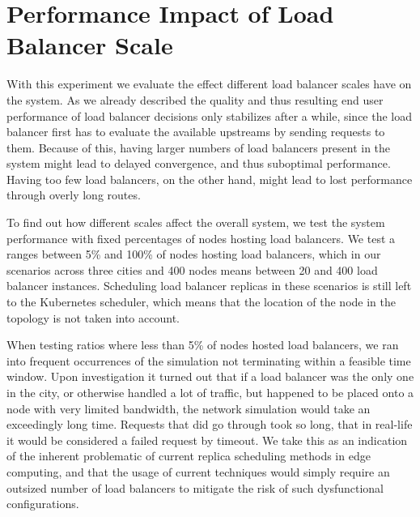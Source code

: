 \section{Performance Impact of Load Balancer Scale}
With this experiment we evaluate the effect different load balancer scales have on the system.
As we already described the quality and thus resulting end user performance of load balancer decisions only stabilizes after a while, since the load balancer first has to evaluate the available upstreams by sending requests to them.
Because of this, having larger numbers of load balancers present in the system might lead to delayed convergence, and thus suboptimal performance.
Having too few load balancers, on the other hand, might lead to lost performance through overly long routes.

To find out how different scales affect the overall system, we test the system performance with fixed percentages of nodes hosting load balancers.
We test a ranges between 5\% and 100\% of nodes hosting load balancers, which in our scenarios across three cities and 400 nodes means between 20 and 400 load balancer instances.
Scheduling load balancer replicas in these scenarios is still left to the Kubernetes scheduler, which means that the location of the node in the topology is not taken into account.

When testing ratios where less than 5\% of nodes hosted load balancers, we ran into frequent occurrences of the simulation not terminating within a feasible time window.
Upon investigation it turned out that if a load balancer was the only one in the city, or otherwise handled a lot of traffic, but happened to be placed onto a node with very limited bandwidth, the network simulation would take an exceedingly long time.
Requests that did go through took so long, that in real-life it would be considered a failed request by timeout.
We take this as an indication of the inherent problematic of current replica scheduling methods in edge computing, and that the usage of current techniques would simply require an outsized number of load balancers to mitigate the risk of such dysfunctional configurations.

